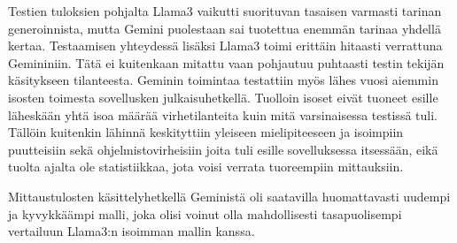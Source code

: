 Testien tuloksien pohjalta Llama3 vaikutti suorituvan tasaisen varmasti tarinan
generoinnista, mutta Gemini puolestaan sai tuotettua enemmän tarinaa yhdellä
kertaa. Testaamisen yhteydessä lisäksi Llama3 toimi erittäin hitaasti
verrattuna Gemininiin. Tätä ei kuitenkaan mitattu vaan pohjautuu puhtaasti
testin tekijän käsitykseen tilanteesta. Geminin toimintaa testattiin myös lähes
vuosi aiemmin isosten toimesta sovellusken julkaisuhetkellä. Tuolloin isoset
eivät tuoneet esille läheskään yhtä isoa määrää virhetilanteita kuin mitä
varsinaisessa testissä tuli. Tällöin kuitenkin lähinnä keskityttiin yleiseen
mielipiteeseen ja isoimpiin puutteisiin sekä ohjelmistovirheisiin joita tuli
esille sovelluksessa itsessään, eikä tuolta ajalta ole statistiikkaa, jota
voisi verrata tuoreempiin mittauksiin.

Mittaustulosten käsittelyhetkellä Geministä oli saatavilla huomattavasti
uudempi ja kyvykkäämpi malli, joka olisi voinut olla mahdollisesti
tasapuolisempi vertailuun Llama3:n isoimman mallin kanssa. \parencite{gemini2}
